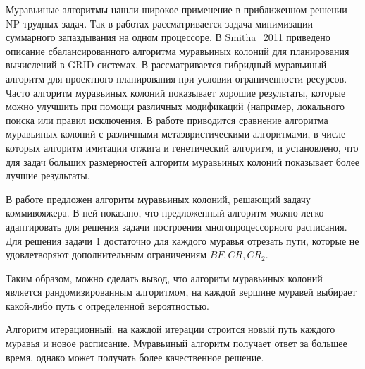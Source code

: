 \documentclass{article}
\begin{document}
\par Муравьиные алгоритмы нашли широкое применение в приближенном решении NP-трудных задач. Так в работах \cite{Bauer_2000} рассматривается задача минимизации суммарного запаздывания на одном процессоре. В Smitha\_2011 приведено описание сбалансированного алгоритма муравьиных колоний для планирования вычислений в GRID-системах. В \cite{Myszkowski_2015} рассматривается гибридный муравьиный алгоритм для проектного планирования при условии ограниченности ресурсов. Часто алгоритм муравьиных колоний показывает хорошие результаты, которые можно улучшить при помощи различных модификаций (например, локального поиска или правил исключения. В работе \cite{Gagne_2015} приводится сравнение алгоритма муравьиных колоний с различными метаэвристическими алгоритмами, в числе которых алгоритм имитации отжига и генетический алгоритм, и установлено, что для задач больших размерностей алгоритм муравьиных колоний показывает более лучшие результаты. \par
В работе \cite{Shtovba_2005} предложен алгоритм муравьиных колоний, решающий задачу коммивояжера. В ней показано, что предложенный алгоритм можно легко адаптировать для решения задачи построения многопроцессорного расписания. Для решения задачи 1 достаточно для каждого муравья отрезать пути, которые не удовлетворяют дополнительным ограничениям $BF, CR, CR_2$. \par
Таким образом, можно сделать вывод, что алгоритм муравьиных колоний является рандомизированным алгоритмом, на каждой вершине муравей выбирает какой-либо путь с определенной вероятностью. \par
Алгоритм итерационный: на каждой итерации строится новый путь каждого муравья и новое расписание. Муравьиный алгоритм получает ответ за большее время, однако может получать более качественное решение.
\end{document}

